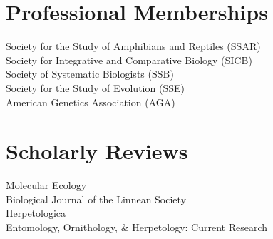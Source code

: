\documentclass[11pt,a4paper,sans]{moderncv}        %
\begin{document}
\section{Professional Memberships}
Society for the Study of Amphibians and Reptiles (SSAR) \\
Society for Integrative and Comparative Biology (SICB) \\
Society of Systematic Biologists (SSB) \\
Society for the Study of Evolution (SSE) \\
American Genetics Association (AGA) 


\section{Scholarly Reviews}
Molecular Ecology \\
Biological Journal of the Linnean Society \\
Herpetologica \\
Entomology, Ornithology, \& Herpetology: Current Research \\
\end{document}
